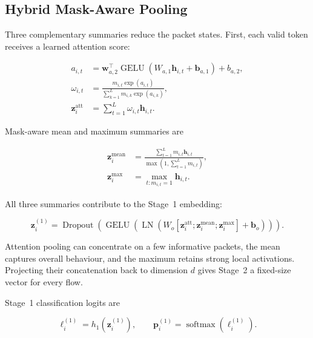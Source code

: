 \documentclass[11pt,fleqn]{report}
\begin{document}
\subsection{Hybrid Mask-Aware Pooling}
\label{subsubsec:hybrid_pooling}

Three complementary summaries reduce the packet states. First, each valid token receives a learned attention score:

\begin{align}
    a_{i,t}
    &=\mathbf{w}_{a,2}^{\top}
      \operatorname{GELU}
      \left(W_{a,1}\mathbf{h}_{i,t}+\mathbf{b}_{a,1}\right)+b_{a,2},\\
    \omega_{i,t}
    &=\frac{m_{i,t}\exp(a_{i,t})}
      {\sum_{k=1}^{L}m_{i,k}\exp(a_{i,k})},\\
    \mathbf{z}^{\mathrm{att}}_i
    &=\sum_{t=1}^{L}\omega_{i,t}\mathbf{h}_{i,t}.
    \label{eq:stage1_attention_pooling}
\end{align}

Mask-aware mean and maximum summaries are

\begin{align}
    \mathbf{z}^{\mathrm{mean}}_i
    &=\frac{\sum_{t=1}^{L}m_{i,t}\mathbf{h}_{i,t}}
            {\max(1,\sum_{t=1}^{L}m_{i,t})},\\
    \mathbf{z}^{\mathrm{max}}_i
    &=\max_{t:m_{i,t}=1}\mathbf{h}_{i,t}.
    \label{eq:mean_max_pooling}
\end{align}

All three summaries contribute to the Stage~1 embedding:

\begin{equation}
    \mathbf{z}^{(1)}_i
    =\operatorname{Dropout}
      \left(
        \operatorname{GELU}
        \left(
          \operatorname{LN}
          \left(
            W_o
            [\mathbf{z}^{\mathrm{att}}_i;
             \mathbf{z}^{\mathrm{mean}}_i;
             \mathbf{z}^{\mathrm{max}}_i]
            +\mathbf{b}_o
          \right)
        \right)
      \right).
    \label{eq:hybrid_pooling}
\end{equation}

Attention pooling can concentrate on a few informative packets, the mean captures overall behaviour, and the maximum retains strong local activations. Projecting their concatenation back to dimension $d$ gives Stage~2 a fixed-size vector for every flow.

Stage~1 classification logits are

\begin{equation}
    \boldsymbol{\ell}^{(1)}_i
    =h_1(\mathbf{z}^{(1)}_i),
    \qquad
    \mathbf{p}^{(1)}_i
    =\operatorname{softmax}(\boldsymbol{\ell}^{(1)}_i).
    \label{eq:stage1_classifier}
\end{equation}
\end{document}
